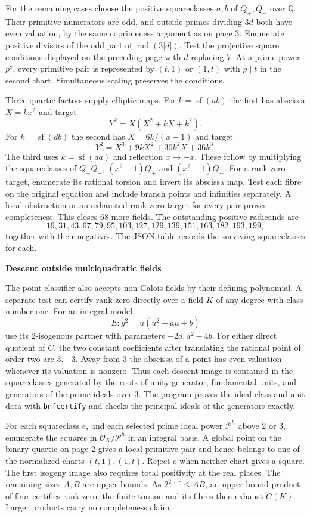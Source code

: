 \documentclass[12pt]{article}
\newcommand{\Q}{\mathbb Q}\newcommand{\Z}{\mathbb Z}
\newcommand{\head}[1]{{\Large\bfseries\color{ink}#1}\par\vspace{3pt}}
\begin{document}
For the remaining cases choose the positive squareclasses $a,b$ of $Q_+,Q_-$ over $\Q$. Their primitive numerators are odd, and outside primes dividing $3d$ both have even valuation, by the same coprimeness argument as on page 3. Enumerate positive divisors of the odd part of $\operatorname{rad}(3|d|)$. Test the projective square conditions displayed on the preceding page with $d$ replacing 7. At a prime power $p^e$, every primitive pair is represented by $(t,1)$ or $(1,t)$ with $p\mid t$ in the second chart. Simultaneous scaling preserves the conditions.

Three quartic factors supply elliptic maps. For $k=\operatorname{sf}(ab)$ the first has abscissa $X=kx^2$ and target
\[
                   Y^2=X(X^2+kX+k^2).
\]
For $k=\operatorname{sf}(db)$ the second has $X=6k/(x-1)$ and target
\[
                   Y^2=X^3+9kX^2+30k^2X+36k^3 .
\]
The third uses $k=\operatorname{sf}(da)$ and reflection $x\mapsto -x$. These follow by multiplying the squareclasses of $Q_+Q_-$, $(x^2-1)Q_+$ and $(x^2-1)Q_-$. For a rank-zero target, enumerate its rational torsion and invert its abscissa map. Test each fibre on the original equation and include branch points and infinities separately. A local obstruction or an exhausted rank-zero target for every pair proves completeness. This closes 68 more fields. The outstanding positive radicands are
\[
 19,31,43,67,79,95,103,127,129,139,151,163,182,193,199,
\]
together with their negatives. The JSON table records the surviving squareclasses for each.

\newpage
\head{Descent outside multiquadratic fields}
The point classifier also accepts non-Galois fields by their defining polynomial. A separate test can certify rank zero directly over a field $K$ of any degree with class number one. For an integral model
\[
       E:y^2=u(u^2+au+b)
\]
use its 2-isogenous partner with parameters $-2a,a^2-4b$. For either direct quotient of $C$, the two constant coefficients after translating the rational point of order two are $3,-3$. Away from 3 the abscissa of a point has even valuation whenever its valuation is nonzero. Thus each descent image is contained in the squareclasses generated by the roots-of-unity generator, fundamental units, and generators of the prime ideals over 3. The program proves the ideal class and unit data with \texttt{bnfcertify} and checks the principal ideals of the generators exactly.

For each squareclass $e$, and each selected prime ideal power $\mathcal P^h$ above 2 or 3, enumerate the squares in $\mathcal O_K/\mathcal P^h$ in an integral basis. A global point on the binary quartic on page 2 gives a local primitive pair and hence belongs to one of the normalized charts $(t,1),(1,t)$. Reject $e$ when neither chart gives a square. The first isogeny image also requires total positivity at the real places. The remaining sizes $A,B$ are upper bounds. As $2^{2+r}\le AB$, an upper bound product of four certifies rank zero; the finite torsion and its fibres then exhaust $C(K)$. Larger products carry no completeness claim.
\end{document}
